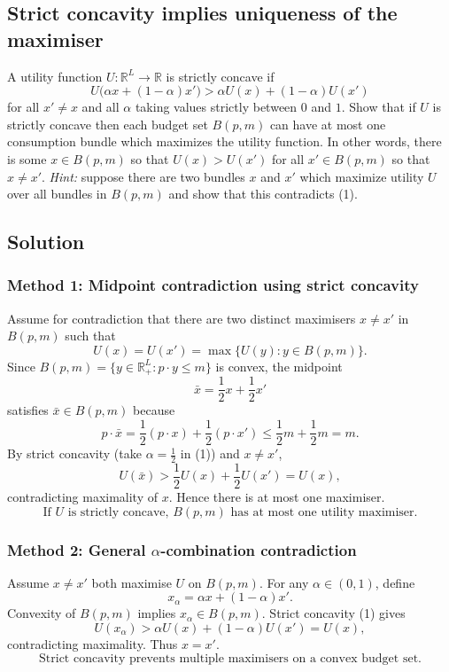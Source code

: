 \documentclass[12pt]{article}
\newcommand{\R}{\mathbb{R}}
\newcommand{\Rp}{\mathbb{R}_+}
\newcommand{\dotp}{\cdot}
\begin{document}
\subsection{Strict concavity implies uniqueness of the maximiser}
A utility function \(U:\R^{L}\to\R\) is strictly concave if
\begin{equation}\tag{1}
U\bigl(\alpha x+(1-\alpha)x'\bigr)>\alpha U(x)+(1-\alpha)U(x')
\end{equation}
for all \(x'\neq x\) and all \(\alpha\) taking values strictly between \(0\) and \(1\).
Show that if \(U\) is strictly concave then each budget set \(B(p,m)\) can have at most one consumption
bundle which maximizes the utility function. In other words, there is some \(x\in B(p,m)\)
so that \(U(x)>U(x')\) for all \(x'\in B(p,m)\) so that \(x\neq x'\).
\emph{Hint:} suppose there are two bundles \(x\) and \(x'\) which maximize utility \(U\) over all bundles in \(B(p,m)\) and show that this contradicts (1).

\subsection*{Solution}
\subsubsection*{Method 1: Midpoint contradiction using strict concavity}
Assume for contradiction that there are two distinct maximisers \(x\neq x'\) in \(B(p,m)\) such that
\[
U(x)=U(x')=\max\{U(y):y\in B(p,m)\}.
\]
Since \(B(p,m)=\{y\in\Rp^{L}:p\dotp y\le m\}\) is convex, the midpoint
\[
\bar x=\frac12 x+\frac12 x'
\]
satisfies \(\bar x\in B(p,m)\) because
\[
p\dotp \bar x=\frac12(p\dotp x)+\frac12(p\dotp x')\le \frac12 m+\frac12 m=m.
\]
By strict concavity (take \(\alpha=\frac12\) in (1)) and \(x\neq x'\),
\[
U(\bar x)>\frac12 U(x)+\frac12 U(x')=U(x),
\]
contradicting maximality of \(x\). Hence there is at most one maximiser.
\[
\boxed{\text{If }U\text{ is strictly concave, }B(p,m)\text{ has at most one utility maximiser.}}
\]

\subsubsection*{Method 2: General \(\alpha\)-combination contradiction}
Assume \(x\neq x'\) both maximise \(U\) on \(B(p,m)\). For any \(\alpha\in(0,1)\), define
\[
x_\alpha=\alpha x+(1-\alpha)x'.
\]
Convexity of \(B(p,m)\) implies \(x_\alpha\in B(p,m)\). Strict concavity (1) gives
\[
U(x_\alpha)>\alpha U(x)+(1-\alpha)U(x')=U(x),
\]
contradicting maximality. Thus \(x=x'\).
\[
\boxed{\text{Strict concavity prevents multiple maximisers on a convex budget set.}}
\]
\end{document}
